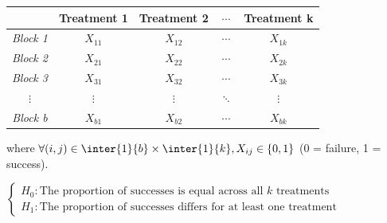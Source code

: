\begin{center}
    \begin{tabularx}{.65\textwidth}{|*{5}{c|}}
    \hline
     & \textbf{Treatment 1} & \textbf{Treatment 2} & $\cdots$  & \textbf{Treatment k}\\
    \hline
    \emph{Block 1} & $X_{11}$ & $X_{12}$ & $\cdots$  & $X_{1k}$\\
    \hline
    \emph{Block 2} & $X_{21}$ & $X_{22}$ & $\cdots$  & $X_{2k}$\\
    \hline
    \emph{Block 3} & $X_{31}$ & $X_{32}$ & $\cdots$  & $X_{3k}$\\
    \hline
    $\vdots$ & $\vdots$ & $\vdots$ & $\ddots$ & $\vdots$ \\
    \hline
    \emph{Block b} & $X_{b1}$ & $X_{b2}$ & $\cdots$  & $X_{bk}$\\
    \hline
    \end{tabularx}
\end{center}

where $\forall (i,j)\in\inter{1}{b}\times\inter{1}{k}, X_{ij}\in\left\{0, 1\right\}$
(0 = failure, 1 = success).

$\begin{cases}
    H_{0}: \text{The proportion of successes is equal across all } k \text{ treatments}\\
    H_{1}: \text{The proportion of successes differs for at least one treatment}
\end{cases}$

